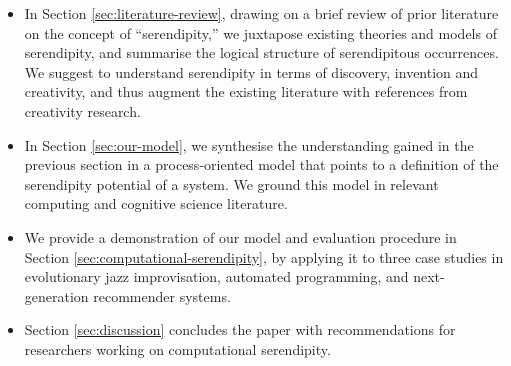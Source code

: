 \begin{itemize}
\item In Section \ref{sec:literature-review}, drawing on a brief review of prior literature on the concept of ``serendipity,'' we juxtapose existing theories and models of serendipity, and summarise the logical structure of serendipitous occurrences. We suggest to understand serendipity in terms of discovery, invention and creativity, and thus augment the existing literature with references from creativity research.
\item In Section \ref{sec:our-model}, we synthesise the understanding gained in the previous section in a process-oriented model that points to a definition of the serendipity potential of a system.  We ground this model in relevant computing and cognitive science literature.
\item We provide a demonstration of our model and evaluation procedure in Section \ref{sec:computational-serendipity}, by applying it to three case studies in evolutionary jazz improvisation, automated
programming, and next-generation recommender systems.
\item Section \ref{sec:discussion} concludes the paper with recommendations for researchers working on computational serendipity.
\end{itemize}
\fi



